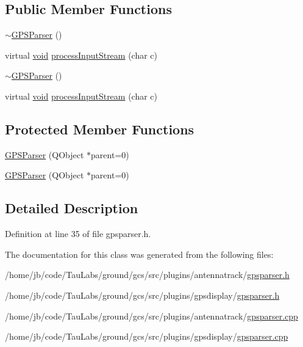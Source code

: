 \subsection*{\-Public \-Member \-Functions}
\begin{DoxyCompactItemize}
\item 
\hyperlink{group___antenna_track_gadget_plugin_ga6773ae49e6fecc274191f0d0e29294d8}{$\sim$\-G\-P\-S\-Parser} ()
\item 
virtual \hyperlink{group___u_a_v_objects_plugin_ga444cf2ff3f0ecbe028adce838d373f5c}{void} \hyperlink{group___antenna_track_gadget_plugin_ga0d2ef23accd7d2cd3e098012f2f8e948}{process\-Input\-Stream} (char c)
\item 
\hyperlink{group___g_p_s_gadget_plugin_ga6773ae49e6fecc274191f0d0e29294d8}{$\sim$\-G\-P\-S\-Parser} ()
\item 
virtual \hyperlink{group___u_a_v_objects_plugin_ga444cf2ff3f0ecbe028adce838d373f5c}{void} \hyperlink{group___g_p_s_gadget_plugin_gaeffbbe785fb02705aba8d3e2b0aee5e5}{process\-Input\-Stream} (char c)
\end{DoxyCompactItemize}
\subsection*{\-Protected \-Member \-Functions}
\begin{DoxyCompactItemize}
\item 
\hyperlink{group___antenna_track_gadget_plugin_ga15bb435154bfad7f732bc090c496915e}{\-G\-P\-S\-Parser} (\-Q\-Object $\ast$parent=0)
\item 
\hyperlink{group___g_p_s_gadget_plugin_ga15bb435154bfad7f732bc090c496915e}{\-G\-P\-S\-Parser} (\-Q\-Object $\ast$parent=0)
\end{DoxyCompactItemize}


\subsection{\-Detailed \-Description}


\-Definition at line 35 of file gpsparser.\-h.



\-The documentation for this class was generated from the following files\-:\begin{DoxyCompactItemize}
\item 
/home/jb/code/\-Tau\-Labs/ground/gcs/src/plugins/antennatrack/\hyperlink{antennatrack_2gpsparser_8h}{gpsparser.\-h}\item 
/home/jb/code/\-Tau\-Labs/ground/gcs/src/plugins/gpsdisplay/\hyperlink{gpsdisplay_2gpsparser_8h}{gpsparser.\-h}\item 
/home/jb/code/\-Tau\-Labs/ground/gcs/src/plugins/antennatrack/\hyperlink{antennatrack_2gpsparser_8cpp}{gpsparser.\-cpp}\item 
/home/jb/code/\-Tau\-Labs/ground/gcs/src/plugins/gpsdisplay/\hyperlink{gpsdisplay_2gpsparser_8cpp}{gpsparser.\-cpp}\end{DoxyCompactItemize}
